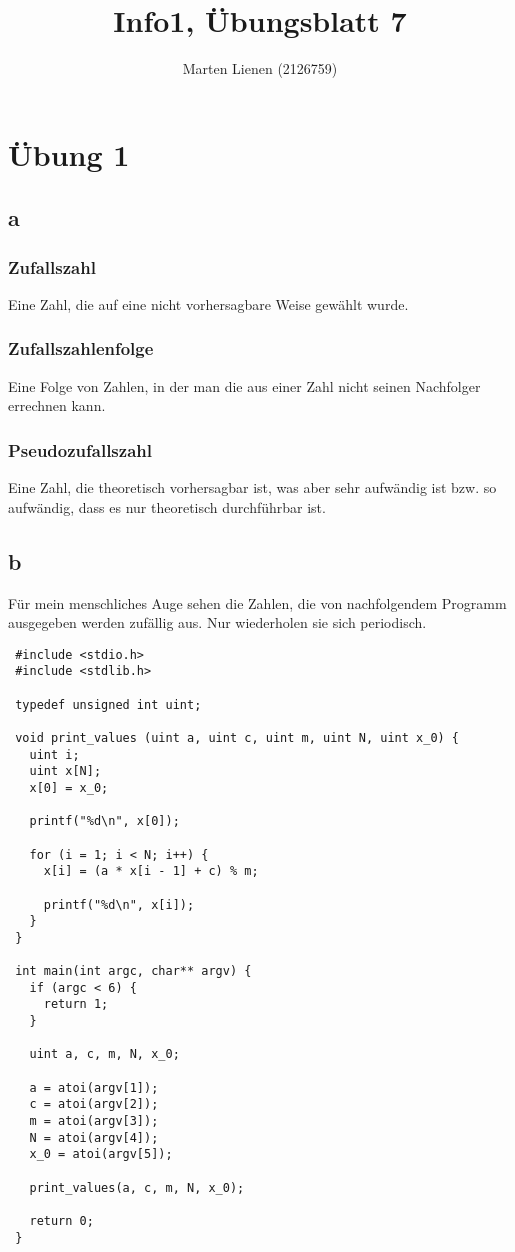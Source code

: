 \documentclass[a4paper,10pt]{article}
\title{Info1, Übungsblatt 7}
\author{Marten Lienen (2126759)}
\begin{document}
\maketitle

\section*{Übung 1}

\subsection*{a}

\subsubsection*{Zufallszahl}

Eine Zahl, die auf eine nicht vorhersagbare Weise gewählt wurde.

\subsubsection*{Zufallszahlenfolge}

Eine Folge von Zahlen, in der man die aus einer Zahl nicht seinen Nachfolger errechnen kann.

\subsubsection*{Pseudozufallszahl}

Eine Zahl, die theoretisch vorhersagbar ist, was aber sehr aufwändig ist bzw. so aufwändig, dass es nur theoretisch durchführbar ist.

\subsection*{b}

Für mein menschliches Auge sehen die Zahlen, die von nachfolgendem Programm ausgegeben werden zufällig aus.
Nur wiederholen sie sich periodisch.

\lstset{language=c}
\begin{lstlisting}
 #include <stdio.h>
 #include <stdlib.h>

 typedef unsigned int uint;

 void print_values (uint a, uint c, uint m, uint N, uint x_0) {
   uint i;
   uint x[N];
   x[0] = x_0;
  
   printf("%d\n", x[0]);
  
   for (i = 1; i < N; i++) {
     x[i] = (a * x[i - 1] + c) % m;
    
     printf("%d\n", x[i]);
   }
 }

 int main(int argc, char** argv) {
   if (argc < 6) {
     return 1;
   }
  
   uint a, c, m, N, x_0;
  
   a = atoi(argv[1]);
   c = atoi(argv[2]);
   m = atoi(argv[3]);
   N = atoi(argv[4]);
   x_0 = atoi(argv[5]);
  
   print_values(a, c, m, N, x_0);

   return 0;
 }
\end{lstlisting}
\end{document}
